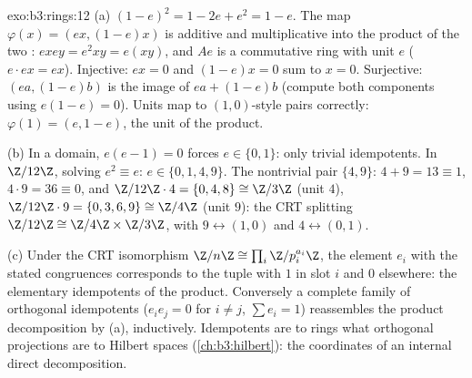 \begin{solution}{exo:b3:rings:12}
(a) $(1-e)^2 = 1 - 2e + e^2 = 1 - e$. The map $\varphi(x) =
(ex, (1-e)x)$ is additive and multiplicative into the product
of the two : $exey = e^2xy = e(xy)$, and $Ae$ is a
commutative ring with unit $e$ ($e\cdot ex = ex$). Injective:
$ex = 0$ and $(1-e)x = 0$ sum to $x = 0$. Surjective: $(ea,
(1-e)b)$ is the image of $ea + (1-e)b$ (compute both
components using $e(1-e) = 0$). Units map to $(1, 0)$-style
pairs correctly: $\varphi(1) = (e, 1-e)$, the unit of the
product.

(b) In a domain, $e(e - 1) = 0$ forces $e \in \{0, 1\}$: only
trivial idempotents. In $\Z/12\Z$, solving $e^2 \equiv e$: $e
\in \{0, 1, 4, 9\}$. The nontrivial pair $\{4, 9\}$: $4 + 9 =
13 \equiv 1$, $4\cdot9 = 36 \equiv 0$, and $\Z/12\Z\cdot4 =
\{0, 4, 8\} \cong \Z/3\Z$ (unit $4$), $\Z/12\Z\cdot9 = \{0,
3, 6, 9\} \cong \Z/4\Z$ (unit $9$): the CRT splitting
$\Z/12\Z \cong \Z/4\Z\times\Z/3\Z$, with $9 \leftrightarrow
(1, 0)$ and $4 \leftrightarrow (0, 1)$.

(c) Under the CRT isomorphism $\Z/n\Z \cong \prod_i
\Z/p_i^{a_i}\Z$, the element $e_i$ with the stated
congruences corresponds to the tuple with $1$ in slot $i$ and
$0$ elsewhere: the elementary idempotents of the product.
Conversely a complete family of orthogonal idempotents
($e_ie_j = 0$ for $i \neq j$, $\sum e_i = 1$) reassembles the
product decomposition by (a), inductively. Idempotents are to
rings what orthogonal projections are to Hilbert spaces
(\cref{ch:b3:hilbert}): the coordinates of an internal direct
decomposition.
\end{solution}

